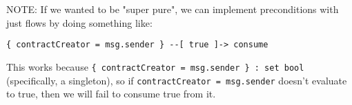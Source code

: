 \documentclass[dvipsnames, usenames, sigconf]{acmart}
\begin{document}


NOTE: If we wanted to be "super pure", we can implement preconditions with just flows by doing something like:
\begin{lstlisting}
{ contractCreator = msg.sender } --[ true ]-> consume
\end{lstlisting}
This works because \lstinline|{ contractCreator = msg.sender } : set bool| (specifically, a singleton), so if \lstinline{contractCreator = msg.sender} doesn't evaluate to true, then we will fail to consume true from it.
\end{document}
